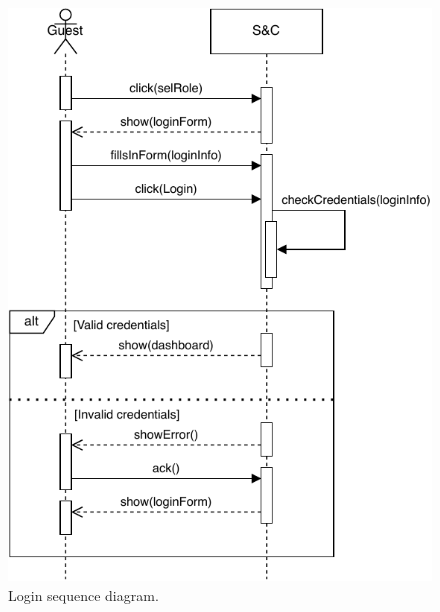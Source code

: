 \begin{figure}[H]
    \begin{center}
        \includegraphics[width=\linewidth]{Images/SequenceDiagram/LoginSD.pdf}
        \caption{Login sequence diagram.}
        \label{fig:login_seqdiag}%
    \end{center}
\end{figure}


